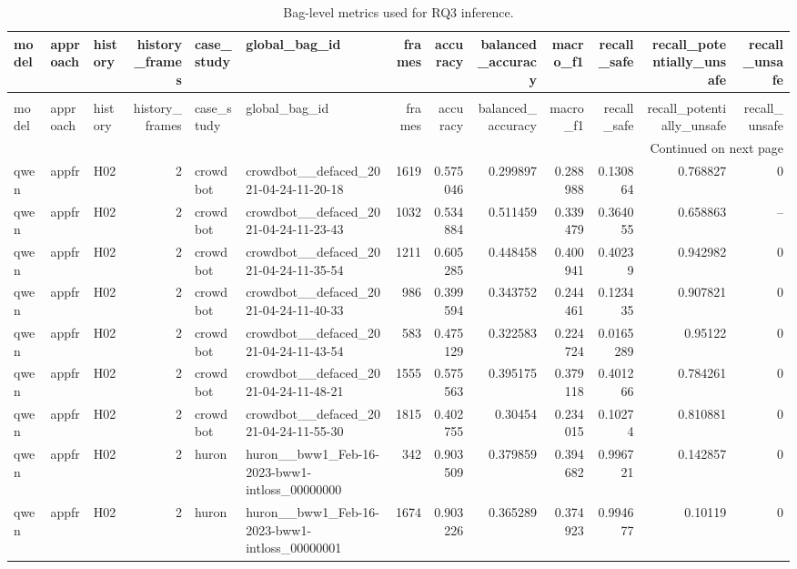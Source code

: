 \begin{longtable}{lllrllrrrrrrr}
\caption{Bag-level metrics used for RQ3 inference.} \label{tab:rq3-bag-metrics} \\
\toprule
model & approach & history & history\_frames & case\_study & global\_bag\_id & frames & accuracy & balanced\_accuracy & macro\_f1 & recall\_safe & recall\_potentially\_unsafe & recall\_unsafe \\
\midrule
\endfirsthead
\caption[]{Bag-level metrics used for RQ3 inference.} \\
\toprule
model & approach & history & history\_frames & case\_study & global\_bag\_id & frames & accuracy & balanced\_accuracy & macro\_f1 & recall\_safe & recall\_potentially\_unsafe & recall\_unsafe \\
\midrule
\endhead
\midrule
\multicolumn{13}{r}{Continued on next page} \\
\midrule
\endfoot
\bottomrule
\endlastfoot
qwen & appfr & H02 & 2 & crowdbot & crowdbot\_\_defaced\_2021-04-24-11-20-18 & 1619 & 0.575046 & 0.299897 & 0.288988 & 0.130864 & 0.768827 & 0 \\
qwen & appfr & H02 & 2 & crowdbot & crowdbot\_\_defaced\_2021-04-24-11-23-43 & 1032 & 0.534884 & 0.511459 & 0.339479 & 0.364055 & 0.658863 & -- \\
qwen & appfr & H02 & 2 & crowdbot & crowdbot\_\_defaced\_2021-04-24-11-35-54 & 1211 & 0.605285 & 0.448458 & 0.400941 & 0.40239 & 0.942982 & 0 \\
qwen & appfr & H02 & 2 & crowdbot & crowdbot\_\_defaced\_2021-04-24-11-40-33 & 986 & 0.399594 & 0.343752 & 0.244461 & 0.123435 & 0.907821 & 0 \\
qwen & appfr & H02 & 2 & crowdbot & crowdbot\_\_defaced\_2021-04-24-11-43-54 & 583 & 0.475129 & 0.322583 & 0.224724 & 0.0165289 & 0.95122 & 0 \\
qwen & appfr & H02 & 2 & crowdbot & crowdbot\_\_defaced\_2021-04-24-11-48-21 & 1555 & 0.575563 & 0.395175 & 0.379118 & 0.401266 & 0.784261 & 0 \\
qwen & appfr & H02 & 2 & crowdbot & crowdbot\_\_defaced\_2021-04-24-11-55-30 & 1815 & 0.402755 & 0.30454 & 0.234015 & 0.10274 & 0.810881 & 0 \\
qwen & appfr & H02 & 2 & huron & huron\_\_bww1\_Feb-16-2023-bww1-intloss\_00000000 & 342 & 0.903509 & 0.379859 & 0.394682 & 0.996721 & 0.142857 & 0 \\
qwen & appfr & H02 & 2 & huron & huron\_\_bww1\_Feb-16-2023-bww1-intloss\_00000001 & 1674 & 0.903226 & 0.365289 & 0.374923 & 0.994677 & 0.10119 & 0 \\

\end{longtable}
